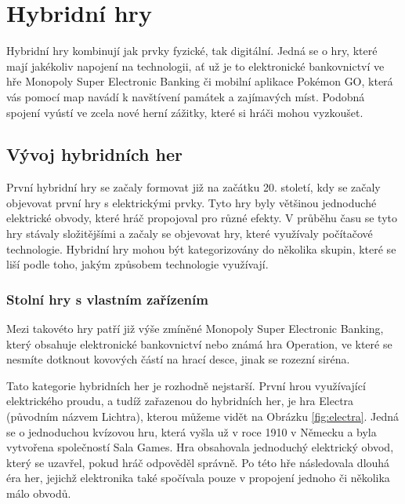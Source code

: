 \chapter{Hybridní hry}
Hybridní hry kombinují jak prvky fyzické, tak digitální. Jedná se o hry, které mají jakékoliv napojení na technologii, ať už je to elektronické bankovnictví ve hře Monopoly Super Electronic Banking či mobilní aplikace Pokémon GO, která vás pomocí map navádí k navštívení památek a zajímavých míst. Podobná spojení vyústí ve zcela nové herní zážitky, které si hráči mohou vyzkoušet. \cite{hybrid_board_games_design}

\section{Vývoj hybridních her}
První hybridní hry se začaly formovat již na začátku 20. století, kdy se začaly objevovat první hry s elektrickými prvky. Tyto hry byly většinou jednoduché elektrické obvody, které hráč propojoval pro různé efekty. V průběhu času se tyto hry stávaly složitějšími a začaly se objevovat hry, které využívaly počítačové technologie. Hybridní hry mohou být kategorizovány do několika skupin, které se liší podle toho, jakým způsobem technologie využívají. \cite{history_of_hybrid_games}

\subsection{Stolní hry s vlastním zařízením}
Mezi takovéto hry patří již výše zmíněné Monopoly Super Electronic Banking, který obsahuje elektronické bankovnictví nebo známá hra Operation, ve které se nesmíte dotknout kovových částí na hrací desce, jinak se rozezní siréna. 

Tato kategorie hybridních her je rozhodně nejstarší. První hrou využívající elektrického proudu, a tudíž zařazenou do hybridních her, je hra Electra (původním názvem Lichtra), kterou můžeme vidět na Obrázku \ref{fig:electra}. Jedná se o jednoduchou kvízovou hru, která vyšla už v roce 1910 v Německu a byla vytvořena společností Sala Games. Hra obsahovala jednoduchý elektrický obvod, který se uzavřel, pokud hráč odpověděl správně. Po této hře následovala dlouhá éra her, jejichž elektronika také spočívala pouze v propojení jednoho či několika málo obvodů. \cite{history_of_hybrid_games, boardgames_with_apps}

